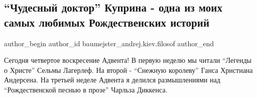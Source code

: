  
 
 
 
 
 
\subsection{\enquote{Чудесный доктор} Куприна - одна из моих самых любимых Рождественских историй}
\label{sec:19_12_2021.fb.baumejster_andrej.kiev.filosof.1.chudesnyj_doktor_kuprin_rozhdestvo}
 
\ifcmt
 author_begin
   author_id baumejster_andrej.kiev.filosof
 author_end
\fi

Сегодня четвертое воскресение Адвента! В первую неделю мы читали \enquote{Легенды о
Христе} Сельмы Лагерлеф. На второй - \enquote{Снежную королеву} Ганса Христиана
Андерсена. На третьей неделе Адвента я делился размышлениями над
\enquote{Рождественской песнью в прозе} Чарльза Диккенса. 

